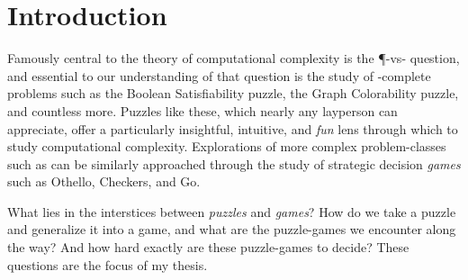 \chapter{Introduction}

Famously central to the theory of computational complexity is the \P-vs-\NP{}
question, and essential to our understanding of that question is the study of
\NP-complete problems such as the Boolean Satisfiability puzzle, the Graph
Colorability puzzle, and countless more.  Puzzles like these, which nearly any
layperson can appreciate, offer a particularly insightful, intuitive, and
\emph{fun} lens through which to study computational complexity. Explorations
of more complex problem-classes such as \PSPACE{} can be similarly approached
through the study of strategic decision \emph{games} such as Othello, Checkers,
and Go.

What lies in the interstices between \emph{puzzles} and \emph{games}?  How do
we take a puzzle and generalize it into a game, and what are the puzzle-games
we encounter along the way?  And how hard exactly are these puzzle-games to
decide?  These questions are the focus of my thesis.

